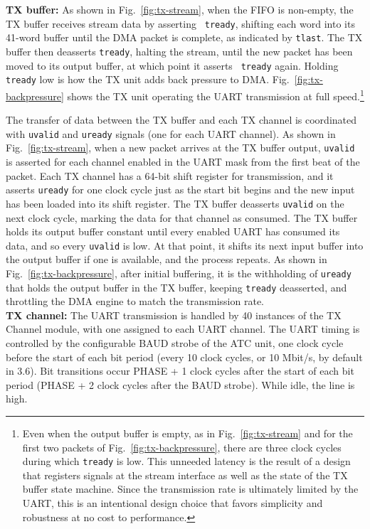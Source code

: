 \documentclass[12pt]{article}
\begin{document}
{\bf TX buffer:} As shown in Fig.~\ref{fig:tx-stream}, when the FIFO
is non-empty, the TX buffer receives stream data by asserting {\tt
  tready}, shifting each word into its 41-word buffer until the DMA
packet is complete, as indicated by {\tt tlast}.  The TX buffer
then deasserts {\tt tready}, halting the stream, until the new packet
has been moved to its output buffer, at which point it asserts {\tt
  tready} again.  Holding {\tt tready} low is how the TX unit adds
back pressure to DMA.  Fig.~\ref{fig:tx-backpressure} shows the TX
unit operating the UART transmission at full speed.\footnote{Even when
the output buffer is empty, as in Fig.~\ref{fig:tx-stream} and for
the first two packets of Fig.~\ref{fig:tx-backpressure}, there are
three clock cycles during which {\tt tready} is low.  This unneeded
latency is the result of a design that registers signals at the stream
interface as well as the state of the TX buffer state machine.  Since
the transmission rate is ultimately limited by the UART, this is an
intentional design choice that favors simplicity and robustness at no
cost to performance.}

The transfer of data between the TX buffer and each TX channel is
coordinated with {\tt uvalid} and {\tt uready} signals (one for each
UART channel).  As shown in Fig.~\ref{fig:tx-stream}, when a new
packet arrives at the TX buffer output, {\tt uvalid} is asserted for
each channel enabled in the UART mask from the first beat of the
packet.  Each TX channel has a 64-bit shift register for transmission,
and it asserts {\tt uready} for one clock cycle just as the start bit
begins and the new input has been loaded into its shift
register. The TX buffer deasserts {\tt uvalid} on the next clock
cycle, marking the data for that channel as consumed.  The TX buffer
holds its output buffer constant until every enabled UART has consumed
its data, and so every {\tt uvalid} is low.  At that point, it shifts
its next input buffer into the output buffer if one is available, and
the process repeats.  As shown in Fig.~\ref{fig:tx-backpressure},
after initial buffering, it is the withholding of {\tt uready} that
holds the output buffer in the TX buffer, keeping {\tt tready} deasserted,
and throttling the DMA engine to match the transmission rate.\\[4pt]

{\bf TX channel:}
The UART transmission is handled by 40 instances of the TX Channel
module, with one assigned to each UART channel.  The UART timing is
controlled by the configurable BAUD strobe of the ATC unit, one clock
cycle before the start of each bit period (every 10 clock cycles, or 10
Mbit/s, by default in 3.6).  Bit transitions occur PHASE + 1 clock
cycles after the start of each bit period (PHASE + 2 clock cycles
after the BAUD strobe).  While idle, the line is high.
\end{document}
